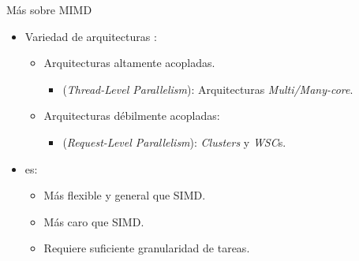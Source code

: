\begin{frame}[t]{Más sobre MIMD}
\begin{itemize}
  \item Variedad de arquitecturas :
    \begin{itemize}
      \item Arquitecturas altamente acopladas.
        \begin{itemize}
          \item {} (\emph{Thread-Level Parallelism}): Arquitecturas \emph{Multi/Many-core}.
        \end{itemize}
      \item Arquitecturas débilmente acopladas:
        \begin{itemize}
          \item {} (\emph{Request-Level Parallelism}): \emph{Clusters} y \emph{WSC}s.
        \end{itemize}
    \end{itemize}

  \item {} es:
    \begin{itemize}
      \item Más flexible y general que SIMD.
      \item Más caro que SIMD.
      \item Requiere suficiente granularidad de tareas.
    \end{itemize}
\end{itemize}
\end{frame}

